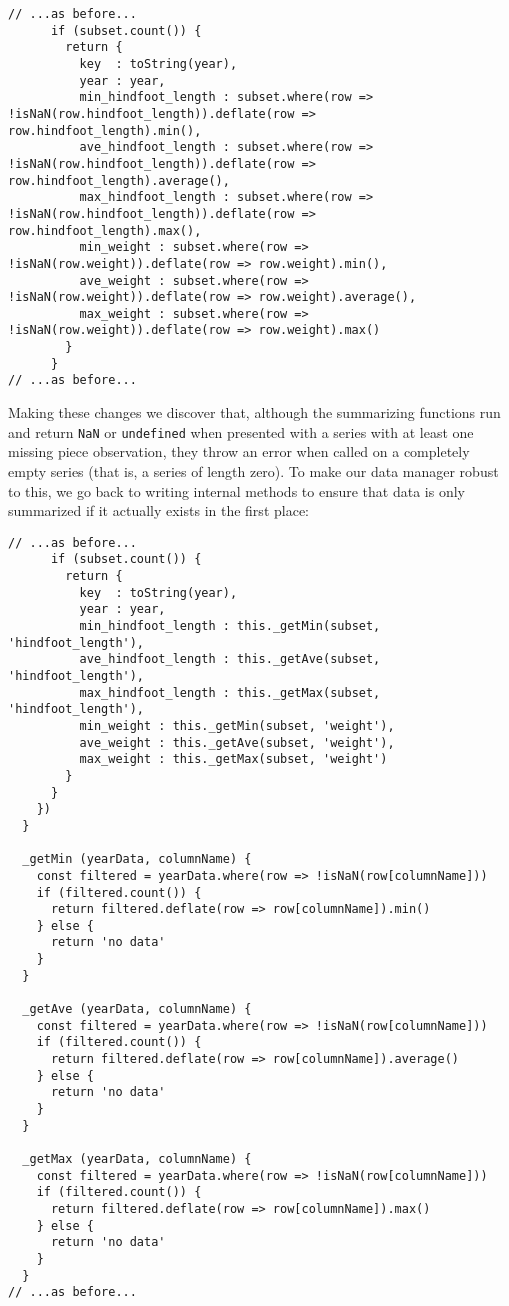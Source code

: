 \begin{verbatim}
// ...as before...
      if (subset.count()) {
        return {
          key  : toString(year),
          year : year,
          min_hindfoot_length : subset.where(row => !isNaN(row.hindfoot_length)).deflate(row => row.hindfoot_length).min(),
          ave_hindfoot_length : subset.where(row => !isNaN(row.hindfoot_length)).deflate(row => row.hindfoot_length).average(),
          max_hindfoot_length : subset.where(row => !isNaN(row.hindfoot_length)).deflate(row => row.hindfoot_length).max(),
          min_weight : subset.where(row => !isNaN(row.weight)).deflate(row => row.weight).min(),
          ave_weight : subset.where(row => !isNaN(row.weight)).deflate(row => row.weight).average(),
          max_weight : subset.where(row => !isNaN(row.weight)).deflate(row => row.weight).max()
        }
      }
// ...as before...
\end{verbatim}

Making these changes we discover that,
although the summarizing functions run and return
\texttt{NaN} or \texttt{undefined}
when presented with a series with at least one missing piece observation,
they throw an error when called on a completely empty series
(that is, a series of length zero).
To make our data manager robust to this,
we go back to writing internal methods
to ensure that data is only summarized
if it actually exists in the first place:

\begin{verbatim}
// ...as before...
      if (subset.count()) {
        return {
          key  : toString(year),
          year : year,
          min_hindfoot_length : this._getMin(subset, 'hindfoot_length'),
          ave_hindfoot_length : this._getAve(subset, 'hindfoot_length'),
          max_hindfoot_length : this._getMax(subset, 'hindfoot_length'),
          min_weight : this._getMin(subset, 'weight'),
          ave_weight : this._getAve(subset, 'weight'),
          max_weight : this._getMax(subset, 'weight')
        }
      }
    })
  }

  _getMin (yearData, columnName) {
    const filtered = yearData.where(row => !isNaN(row[columnName]))
    if (filtered.count()) {
      return filtered.deflate(row => row[columnName]).min()
    } else {
      return 'no data'
    }
  }

  _getAve (yearData, columnName) {
    const filtered = yearData.where(row => !isNaN(row[columnName]))
    if (filtered.count()) {
      return filtered.deflate(row => row[columnName]).average()
    } else {
      return 'no data'
    }
  }

  _getMax (yearData, columnName) {
    const filtered = yearData.where(row => !isNaN(row[columnName]))
    if (filtered.count()) {
      return filtered.deflate(row => row[columnName]).max()
    } else {
      return 'no data'
    }
  }
// ...as before...
\end{verbatim}

